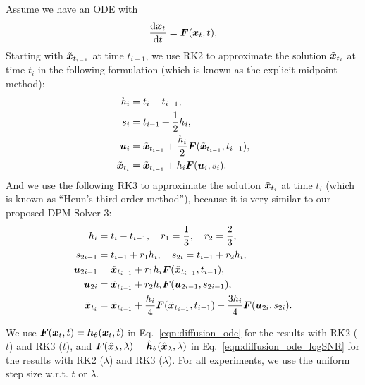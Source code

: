 Assume we have an ODE with
\begin{equation*}
    \frac{\mathrm{d}\bm{x}_t}{\mathrm{d}t} = \bm{F}(\bm{x}_t,t),
\end{equation*}
Starting with $\tilde{\bm{x}}_{t_{i-1}}$ at time $t_{i-1}$, we use RK2 to approximate the solution $\tilde{\bm{x}}_{t_i}$ at time $t_i$ in the following formulation (which is known as the explicit midpoint method):
\begin{equation*}
\begin{aligned}
    h_i &= t_{i} - t_{i-1}, \\
    s_i &= t_{i-1} + \frac{1}{2} h_i, \\
    \bm{u}_i &= \tilde{\bm{x}}_{t_{i-1}} + \frac{h_i}{2}\bm{F}(\tilde{\bm{x}}_{t_{i-1}}, t_{i-1}),\\
    \tilde{\bm{x}}_{t_i} &= \tilde{\bm{x}}_{t_{i-1}} + h_i \bm{F}(\bm{u}_i, s_i).
\end{aligned}
\end{equation*}
And we use the following RK3 to approximate the solution $\tilde{\bm{x}}_{t_i}$ at time $t_i$ (which is known as ``Heun's third-order method''), because it is very similar to our proposed DPM-Solver-3:
\begin{equation*}
\begin{aligned}
    h_i &= t_{i} - t_{i-1}, \quad r_1 = \frac{1}{3}, \quad r_2 = \frac{2}{3}, \\
    s_{2i-1} &= t_{i-1} + r_1 h_i, \quad s_{2i} = t_{i-1} + r_2 h_i, \\
    \bm{u}_{2i-1} &= \tilde{\bm{x}}_{t_{i-1}} + r_1 h_i\bm{F}(\tilde{\bm{x}}_{t_{i-1}}, t_{i-1}),\\
    \bm{u}_{2i} &= \tilde{\bm{x}}_{t_{i-1}} + r_2 h_i\bm{F}(\bm{u}_{2i-1}, s_{2i-1}),\\
    \tilde{\bm{x}}_{t_i} &= \tilde{\bm{x}}_{t_{i-1}} + \frac{h_i}{4} \bm{F}(\tilde{\bm{x}}_{t_{i-1}}, t_{i-1}) + \frac{3 h_i}{4} \bm{F}(\bm{u}_{2i}, s_{2i}).
\end{aligned}
\end{equation*}


We use $\bm{F}(\bm{x}_t,t)=\bm{h}_\theta(\bm{x}_t,t)$ in Eq.~\eqref{eqn:diffusion_ode} for the results with RK2 ($t$) and RK3 ($t$), and $\bm{F}(\hat{\bm{x}}_\lambda, \lambda)=\hat{\bm{h}}_\theta(\hat{\bm{x}}_\lambda,\lambda)$ in Eq.~\eqref{eqn:diffusion_ode_logSNR} for the results with RK2 ($\lambda$) and RK3 ($\lambda$). For all experiments, we use the uniform step size w.r.t. $t$ or $\lambda$.




